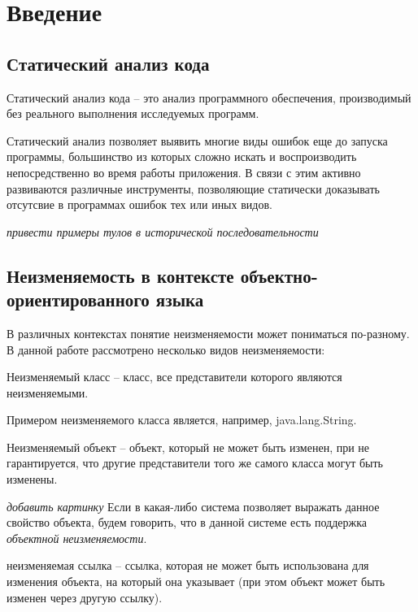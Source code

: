 \chapter{Введение}

\section{Статический анализ кода}

\begin{Def}\label{static_program_analysis}
Статический анализ кода -- это анализ программного обеспечения, производимый без реального выполнения исследуемых программ.
\end{Def}

Статический анализ позволяет выявить многие виды ошибок еще до запуска программы, большинство из которых сложно искать и воспроизводить непосредственно во время работы приложения. В связи с этим активно развиваются различные инструменты, позволяющие статически доказывать отсутсвие в программах ошибок тех или иных видов.  

\textit{привести примеры тулов в исторической последовательности}

\section{Неизменяемость в контексте объектно-ориентированного языка}

В различных контекстах понятие неизменяемости может пониматься по-разному. В данной работе рассмотрено несколько видов неизменяемости:

\begin{Def}\label{immutabule_class}
Неизменяемый класс -- класс, все представители которого являются неизменяемыми. 
\end{Def}

Примером неизменяемого класса является, например, java.lang.String.

\begin{Def}\label{immutable_object}
Неизменяемый объект -- объект, который не может быть изменен, при не гарантируется, что другие представители того же самого класса могут быть изменены.
\end{Def}
\textit{добавить картинку}
Если в какая-либо система позволяет выражать данное свойство объекта, будем говорить, что в данной системе есть поддержка \textit{объектной неизменяемости}.

\begin{Def}\label{reference_immutability}
неизменяемая ссылка -- ссылка, которая не может быть использована для изменения объекта, на который она указывает (при этом объект может быть изменен через другую ссылку).
\end{Def} 

